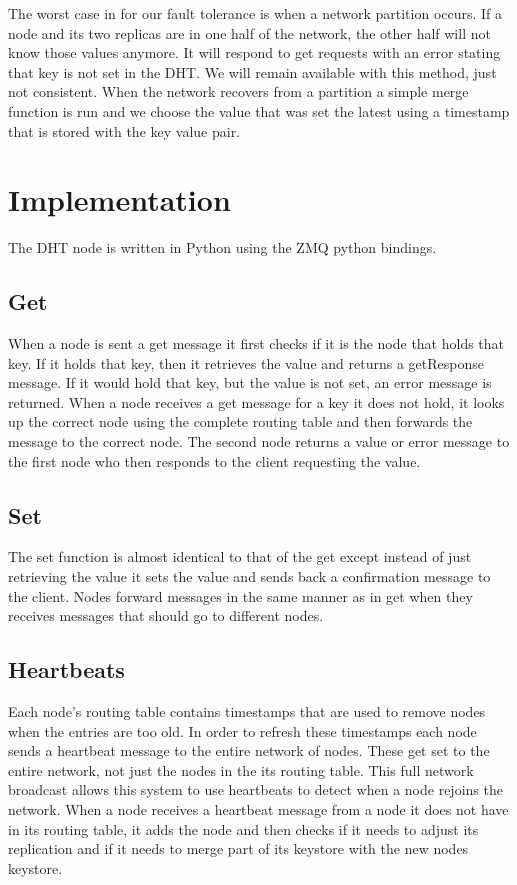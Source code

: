 \documentclass[11pt]{article}
\begin{document}
The worst case in for our fault tolerance is when a network partition occurs. If a node and its two replicas are in one half of the network, the other half will not know those values anymore.  It will respond to get requests with an error stating that key is not set in the DHT. We will remain available with this method, just not consistent. When the network recovers from a partition a simple merge function is run and we choose the value that was set the latest using a timestamp that is stored with the key value pair.

\section{Implementation}\label{sec:imple}

The DHT node is written in Python using the ZMQ python bindings. 

\subsection{Get}\label{sec:get}

When a node is sent a get message it first checks if it is the node that holds that key. If it holds that key, then it retrieves the value and returns a getResponse message. If it would hold that key, but the value is not set, an error message is returned. When a node receives a get message for a key it does not hold, it looks up the correct node using the complete routing table and then forwards the message to the correct node. The second node returns a value or error message to the first node who then responds to the client requesting the value.

\subsection{Set}\label{sec:set}

The set function is almost identical to that of the get except instead of just retrieving the value it sets the value and sends back a confirmation message to the client. Nodes forward messages in the same manner as in get when they receives messages that should go to different nodes.

\subsection{Heartbeats}\label{sec:HB}

Each node's routing table contains timestamps that are used to remove nodes when the entries are too old. In order to refresh these timestamps each node sends a heartbeat message to the entire network of nodes. These get set to the entire network, not just the nodes in the its routing table. This full network broadcast allows this system to use heartbeats to detect when a node rejoins the network. When a node receives a heartbeat message from a node it does not have in its routing table, it adds the node and then checks if it needs to adjust its replication and if it needs to merge part of its keystore with the new nodes keystore.
\end{document}
